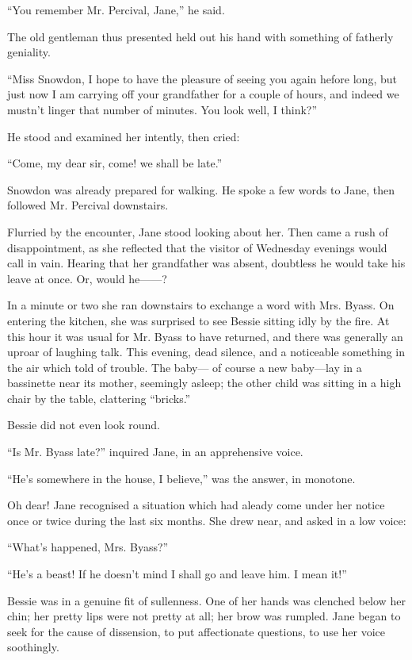``You remember Mr. Percival, Jane,'' he said.

{}The old gentleman thus presented held out his hand with something of
fatherly geniality.

``Miss Snowdon, I hope to have the pleasure of seeing you again hefore
long, but just now I am carrying off your grandfather for a couple of
hours, and indeed we mustn't linger that number of minutes. You look
well, I think?''

He stood and examined her intently, then cried:

``Come, my dear sir, come! we shall be late.''

Snowdon was already prepared for walking. He spoke a few words to Jane,
then followed Mr. Percival downstairs.

Flurried by the encounter, Jane stood looking about her. Then came a
rush of disappointment, as she reflected that the visitor of Wednesday
evenings would call in vain. Hearing that her grandfather was absent,
doubtless he would take his leave at once. Or, would he{{------}}?

In a minute or two she ran downstairs to exchange a word with Mrs.
Byass. On {}entering the kitchen, she was surprised to see Bessie
sitting idly by the fire. At this hour it was usual for Mr. Byass to
have returned, and there was generally an uproar of laughing talk. This
evening, dead silence, and a noticeable something in the air which told
of trouble. The baby--- of course a new baby---lay in a bassinette near
its mother, seemingly asleep; the other child was sitting in a high
chair by the table, clattering ``bricks.''

Bessie did not even look round.

``Is Mr. Byass late?'' inquired Jane, in an apprehensive voice.

``He's somewhere in the house, I believe,'' was the answer, in monotone.

Oh dear! Jane recognised a situation which had aleady come under her
notice once or twice during the last six months. She drew near, and
asked in a low voice:

``What's happened, Mrs. Byass?''

``He's a beast! If he doesn't mind I shall go and leave him. I mean
it!''

Bessie was in a genuine fit of sullenness. One of her hands was clenched
below her {}chin; her pretty lips were not pretty at all; her brow was
rumpled. Jane began to seek for the cause of dissension, to put
affectionate questions, to use her voice soothingly.

